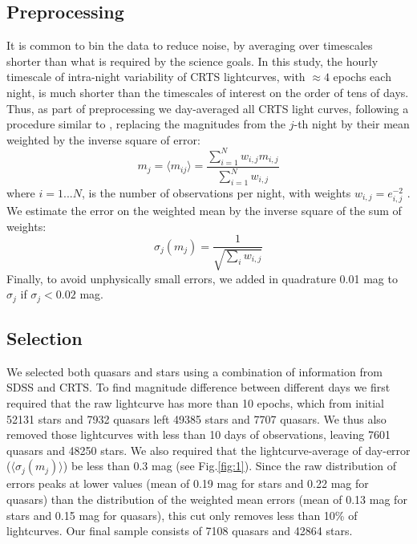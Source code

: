 \documentclass[fleqn,usenatbib]{mnras}  %
\begin{document}
\subsection{Preprocessing}

It is common to bin the data to reduce noise, by averaging over timescales shorter than what is required by the science goals. In this study, the hourly timescale of intra-night variability of CRTS lightcurves, with $\approx 4$ epochs each night, is much shorter than the timescales of interest on the order of tens of days.  Thus, as part of preprocessing we day-averaged all  CRTS light curves, following a procedure similar to \cite{charisi2016}, replacing the magnitudes  from the  $j$-th  night by their mean weighted by the inverse square of error:
\begin{equation}
\label{eq:1}
 m_{j} = \langle m_{ij} \rangle = \frac{\sum_{i=1}^{N} {w_{i,j} m_{i,j}} } {\sum_{i=1}^{N} {w_{i,j}} }
\end{equation}
where $i=1...N$, is the number of observations per night, with weights $w_{i,j} = e_{i,j}^{-2}$ .  
We estimate the error on the weighted mean by the inverse square of the sum of weights:  
\begin{equation}
\sigma_{j}(m_{j}) = \frac{1}{\sqrt{\sum_{i}{w_{i,j}}}}
\end{equation}  Finally, to avoid unphysically small errors, we added in quadrature 0.01 mag  to $\sigma_{j}$ if $\sigma_{j} < 0.02 $ mag. 


\subsection{Selection}
We selected both quasars and stars using a combination of information from SDSS and CRTS. To find magnitude difference between different days we first required that the raw lightcurve has more than 10 epochs, which from initial 52131 stars and 7932 quasars left 49385 stars and 7707 quasars. We thus also removed those lightcurves with less than 10 days of observations, leaving 7601 quasars and 48250 stars.  We also required that the lightcurve-average of day-error ($\langle \sigma_{j}(m_{j}) \rangle$) be less than 0.3 mag (see Fig.\ref{fig:1}). Since the raw distribution of errors   peaks at lower values (mean of 0.19 mag for stars and 0.22 mag for quasars) than the distribution of the weighted mean errors (mean of 0.13 mag for stars and 0.15 mag for quasars), this cut only removes less than 10\% of lightcurves. Our final sample consists of 7108 quasars and 42864 stars.
\end{document}
